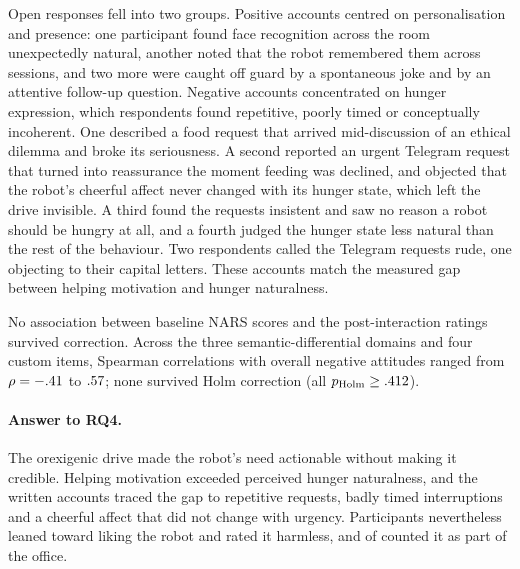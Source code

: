 Open responses fell into two groups. Positive accounts centred on personalisation and presence: one participant found face recognition across the room unexpectedly natural, another noted that the robot remembered them across sessions, and two more were caught off guard by a spontaneous joke and by an attentive follow-up question. Negative accounts concentrated on hunger expression, which \CoreHungerCriticisms{} respondents found repetitive, poorly timed or conceptually incoherent. One described a food request that arrived mid-discussion of an ethical dilemma and broke its seriousness. A second reported an urgent Telegram request that turned into reassurance the moment feeding was declined, and objected that the robot's cheerful affect never changed with its hunger state, which left the drive invisible. A third found the requests insistent and saw no reason a robot should be hungry at all, and a fourth judged the hunger state less natural than the rest of the behaviour. Two respondents called the Telegram requests rude, one objecting to their capital letters. These accounts match the measured gap between helping motivation and hunger naturalness.

No association between baseline NARS scores and the post-interaction ratings survived correction. Across the three semantic-differential domains and four custom items, Spearman correlations with overall negative attitudes ranged from $\rho=-.41$ to $.57$; none survived Holm correction (all $p_{\mathrm{Holm}}\geq.412$).

\paragraph{Answer to RQ4.} The orexigenic drive made the robot's need actionable without making it credible. Helping motivation exceeded perceived hunger naturalness, and the written accounts traced the gap to repetitive requests, badly timed interruptions and a cheerful affect that did not change with urgency. Participants nevertheless leaned toward liking the robot and rated it harmless, and \CoreCustomPartOfEnvironmentAgreement{} of \CoreCohortN{} counted it as part of the office.
